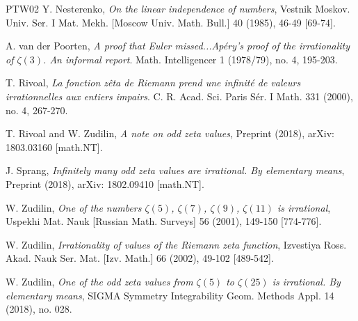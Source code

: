 \documentclass[11pt]{amsart}
\numberwithin{equation}{section}
\begin{document}
\begin{thebibliography}{PTW02}
 Y. Nesterenko, \textit{On the linear independence of numbers}, Vestnik Moskov. Univ. Ser. I Mat. Mekh.
[Moscow Univ. Math. Bull.] 40 (1985), 46-49 [69-74].

 A. van der Poorten, \textit{A proof that Euler missed...Ap{\'e}ry's proof of the irrationality of $\zeta(3)$. An informal report}. Math. Intelligencer 1 (1978/79), no. 4, 195-203.


 T. Rivoal, \textit{La fonction z{\^e}ta de Riemann prend une infinit{\'e} de valeurs irrationnelles aux entiers impairs}.  C. R. Acad. Sci. Paris S{\'e}r. I Math. 331 (2000), no. 4, 267-270.

 T. Rivoal and W. Zudilin, \textit{A note on odd zeta values}, Preprint (2018), arXiv: 1803.03160
[math.NT].

 J. Sprang, \textit{Infinitely many odd zeta values are irrational. By elementary means}, Preprint (2018), arXiv: 1802.09410 [math.NT].

 W. Zudilin, \textit{One of the numbers $\zeta(5)$, $\zeta(7)$, $\zeta(9)$, $\zeta(11)$ is irrational}, Uspekhi Mat. Nauk [Russian Math. Surveys] 56 (2001), 149-150 [774-776].

 W. Zudilin, \textit{Irrationality of values of the Riemann zeta function}, Izvestiya Ross. Akad. Nauk
Ser. Mat. [Izv. Math.] 66 (2002), 49-102 [489-542].

  W. Zudilin, \textit{One of the odd zeta values from $\zeta(5)$ to $\zeta(25)$ is irrational. By elementary means}, SIGMA Symmetry Integrability Geom. Methods Appl. 14 (2018), no. 028.




\end{thebibliography}
\end{document}
